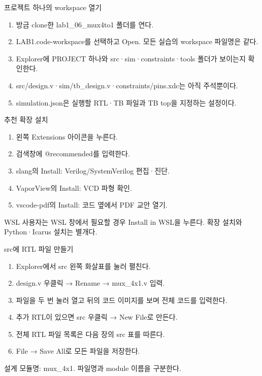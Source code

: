\begin{frame}{프로젝트 하나의 workspace 열기}\relax
\small
\begin{enumerate}\setlength{\itemsep}{0.22cm}
\item 방금 clone한 lab1\_06\_mux4to1 폴더를 연다.
\item LAB1.code-workspace를 선택하고 Open. 모든 실습의 workspace 파일명은 같다.
\item Explorer에 PROJECT 하나와 src·sim·constraints·tools 폴더가 보이는지 확인한다.
\item src/design.v·sim/tb\_design.v·constraints/pins.xdc는 아직 주석뿐이다.
\item simulation.json은 실행할 RTL·TB 파일과 TB top을 지정하는 설정이다.
\end{enumerate}

\end{frame}

\begin{frame}{추천 확장 설치}\relax
\small
\begin{enumerate}\setlength{\itemsep}{0.22cm}
\item 왼쪽 Extensions 아이콘을 누른다.
\item 검색창에 @recommended를 입력한다.
\item slang의 Install: Verilog/SystemVerilog 편집·진단.
\item VaporView의 Install: VCD 파형 확인.
\item vscode-pdf의 Install: 코드 옆에서 PDF 교안 열기.
\end{enumerate}
WSL 사용자는 WSL 창에서 필요할 경우 Install in WSL을 누른다. 확장 설치와 Python·Icarus 설치는 별개다.\par
\end{frame}

\begin{frame}{src에 RTL 파일 만들기}\relax
\small
\begin{enumerate}\setlength{\itemsep}{0.22cm}
\item Explorer에서 src 왼쪽 화살표를 눌러 펼친다.
\item design.v 우클릭 → Rename → mux\_4x1.v 입력.
\item 파일을 두 번 눌러 열고 뒤의 코드 이미지를 보며 전체 코드를 입력한다.
\item 추가 RTL이 있으면 src 우클릭 → New File로 만든다.
\item 전체 RTL 파일 목록은 다음 장의 src 표를 따른다.
\item File → Save All로 모든 파일을 저장한다.
\end{enumerate}
설계 모듈명: mux\_4x1. 파일명과 module 이름을 구분한다.\par
\end{frame}

